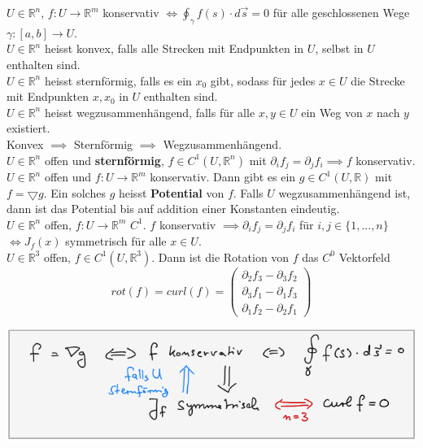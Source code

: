     $U\in\mathbb R^n$, $f:U\rightarrow\mathbb R^m$ konservativ $\iff
    \oint_\gamma f(s)\cdot d\overrightarrow{s}=0$ für alle geschlossenen Wege
    $\gamma:[a,b]\rightarrow U$.\\
    $U\in\mathbb R^n$ heisst konvex, falls alle Strecken mit Endpunkten in $U$,
    selbst in $U$ enthalten sind.\\
    $U\in\mathbb R^n$ heisst sternförmig, falls es ein $x_0$ gibt, sodass für
    jedes $x\in U$ die Strecke mit Endpunkten $x, x_0$ in $U$ enthalten sind.\\
    $U\in\mathbb R^n$ heisst wegzusammenhängend, falls für alle $x,y\in U$ ein
    Weg von $x$ nach $y$ existiert.\\
    Konvex $\implies$ Sternförmig $\implies$ Wegzusammenhängend.\\
    $U\in\mathbb R^n$ offen und \textbf{sternförmig}, $f\in C^1(U,\mathbb R^n)$ mit
    $\partial_if_j=\partial_jf_i\implies f$ konservativ.\\
    $U\in\mathbb R^n$ offen und $f:U\rightarrow\mathbb R^m$ konservativ. Dann
    gibt es ein $g\in C^1(U,\mathbb R)$ mit $f= \bigtriangledown g$. Ein solches
    $g$ heisst \textbf{Potential} von $f$. Falls $U$ wegzusammenhängend ist, dann ist das
    Potential bis auf addition einer Konstanten eindeutig.\\
    $U\in\mathbb R^n$ offen, $f:U\rightarrow\mathbb R^m$ $C^1$. $f$ konservativ
    $\implies\partial_if_j=\partial_jf_i$ für $i,j\in\{1,...,n\}$ $\iff J_f(x)$
    symmetrisch für alle $x\in U$.\\
    $U\in\mathbb R^3$ offen, $f\in C^1(U,\mathbb R^3)$. Dann ist die Rotation
    von $f$ das $C^0$ Vektorfeld 
    $$ rot(f)=curl(f)=\begin{pmatrix}
      \partial_2f_3-\partial_3f_2\\
      \partial_3f_1-\partial_1f_3\\
      \partial_1f_2-\partial_2f_1
      \end{pmatrix} $$
    \begin{minipage}{\linewidth}
      \includegraphics[width=\linewidth]{./media/uebersicht.png}
    \end{minipage}
